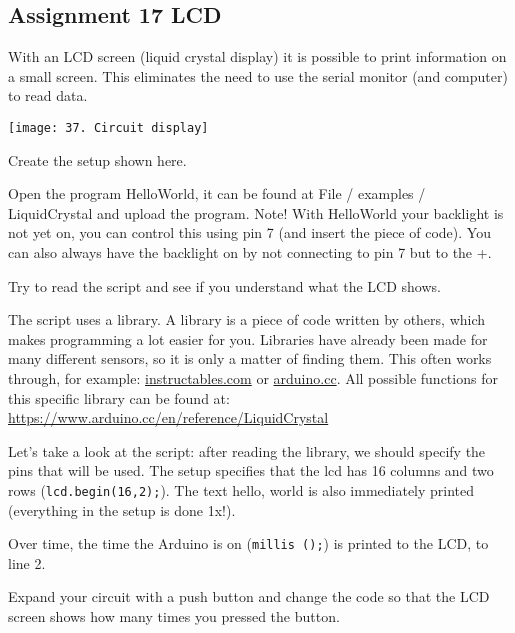 \documentclass{arduino}
\begin{document}
\begin{widebox}
\subsection{Assignment 17 LCD}

With an LCD screen (liquid crystal display) it is possible to print information on a small screen. This eliminates the need to use the serial monitor (and computer) to read data.\vspace{\baselineskip}

\begin{minipage}{\linewidth}\centering
\texttt{[image: 37. Circuit display]}
\end{minipage}

\begin{alphalist}
\item Create the setup shown here.

\item Open the program HelloWorld, it can be found at File / examples / LiquidCrystal and upload the program. Note! With HelloWorld your backlight is not yet on, you can control this using pin 7 (and insert the piece of code). You can also always have the backlight on by not connecting to pin 7 but to the +.

\item Try to read the script and see if you understand what the LCD shows.
\end{alphalist}

The script uses a library. A library is a piece of code written by others, which makes programming a lot easier for you. Libraries have already been made for many different sensors, so it is only a matter of finding them. This often works through, for example: \href{instructables.com}{instructables.com} or \href{arduino.cc}{arduino.cc}. All possible functions for this specific library can be found at: \href{arduino.cc/en/reference/LiquidCrystal}{https://www.arduino.cc/en/reference/LiquidCrystal}

Let's take a look at the script: after reading the library, we should specify the pins that will be used. The setup specifies that the lcd has 16 columns and two rows (\lstinline{lcd.begin(16,2);}). The text hello, world is also immediately printed (everything in the setup is done 1x!).

Over time, the time the Arduino is on (\lstinline{millis ();}) is printed to the LCD, to line 2.

\begin{alphalist}
\item Expand your circuit with a push button and change the code so that the LCD screen shows how many times you pressed the button.
\end{alphalist}
\end{widebox}
\end{document}
